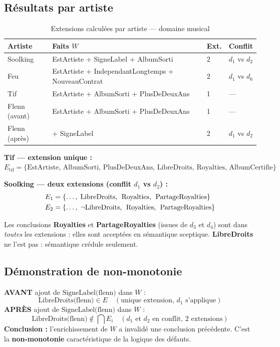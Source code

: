 \subsection{Résultats par artiste}

\begin{table}[H]
\centering
\caption{Extensions calculées par artiste — domaine musical}
\label{tab:defaut-music}
\begin{tabularx}{\linewidth}{lXll}
\toprule
\textbf{Artiste} & \textbf{Faits $W$} & \textbf{Ext.} & \textbf{Conflit} \\
\midrule
Soolking & EstArtiste + SigneLabel + AlbumSorti & 2 & $d_1$ vs $d_2$ \\
Feu      & EstArtiste + IndependantLongtemps + NouveauContrat & 2 & $d_1$ vs $d_6$ \\
Tif      & EstArtiste + AlbumSorti + PlusDeDeuxAns & 1 & — \\
Flenn (avant) & EstArtiste + AlbumSorti + PlusDeDeuxAns & 1 & — \\
Flenn (après) & + SigneLabel & 2 & $d_1$ vs $d_2$ \\
\bottomrule
\end{tabularx}
\end{table}

\noindent\textbf{Tif — extension unique :}
$E_{\text{tif}} = \{\text{EstArtiste, AlbumSorti, PlusDeDeuxAns,
LibreDroits, Royalties, AlbumCertifie}\}$

\medskip
\noindent\textbf{Soolking — deux extensions (conflit $d_1$ vs $d_2$) :}
\begin{align*}
E_1 &= \{\ldots,\; \text{LibreDroits,\; Royalties,\; PartageRoyalties}\} \\
E_2 &= \{\ldots,\; \lnot\text{LibreDroits,\; Royalties,\; PartageRoyalties}\}
\end{align*}

\noindent Les conclusions \textbf{Royalties} et \textbf{PartageRoyalties}
(issues de $d_3$ et $d_4$) sont dans \textit{toutes} les extensions :
elles sont acceptées en sémantique sceptique.
\textbf{LibreDroits} ne l'est pas : sémantique crédule seulement.

\subsection{Démonstration de non-monotonie}

\begin{tcolorbox}[resultbox, title={Non-monotonie — Flenn}]
\textbf{AVANT} ajout de $\text{SigneLabel(flenn)}$ dans $W$ :
\[
  \text{LibreDroits(flenn)} \in E \quad (\text{unique extension, } d_1 \text{ s'applique})
\]
\textbf{APRÈS} ajout de $\text{SigneLabel(flenn)}$ dans $W$ :
\[
  \text{LibreDroits(flenn)} \notin \bigcap E_i \quad (d_1 \text{ et } d_2 \text{ en conflit,
  2 extensions})
\]
\textbf{Conclusion :} l'enrichissement de $W$ a invalidé une conclusion précédente.
C'est la \textbf{non-monotonie} caractéristique de la logique des défauts.
\end{tcolorbox}

